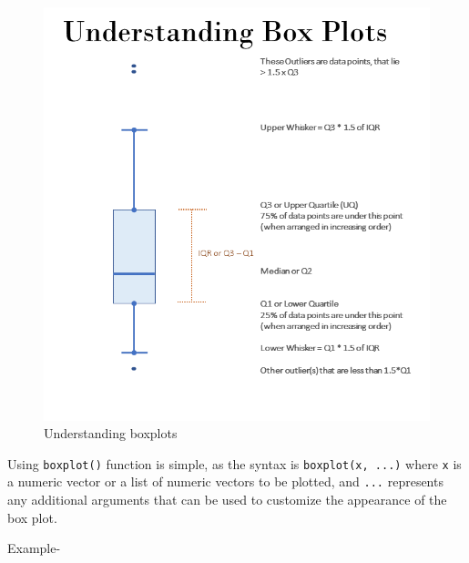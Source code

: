 \documentclass[
]{book}
\newenvironment{Shaded}{\begin{snugshade}}{\end{snugshade}}
\newcommand{\FunctionTok}[1]{\textcolor[rgb]{0.13,0.29,0.53}{\textbf{#1}}}
\newcommand{\NormalTok}[1]{#1}
\newcommand{\SpecialCharTok}[1]{\textcolor[rgb]{0.81,0.36,0.00}{\textbf{#1}}}
\begin{document}
\begin{figure}

{\centering \includegraphics[width=9.35in,height=0.45\textheight]{images/boxplots} 

}

\caption{Understanding boxplots}\label{fig:boxplots}
\end{figure}

Using \texttt{boxplot()} function is simple, as the syntax is \texttt{boxplot(x,\ ...)} where \texttt{x} is a numeric vector or a list of numeric vectors to be plotted, and \texttt{...} represents any additional arguments that can be used to customize the appearance of the box plot.

Example-

\begin{Shaded}
\end{Shaded}
\end{document}
